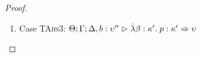 \begin{proof}
\begin{enumerate}
  First, the syntax:
  \begin{tabbedproof}
    \oo By inversion, $\judgeA[\Theta; \Gamma, x:A; \Delta, b:\upsilon'']{p}{\upsilon}$ \\
    \oo By induction, $\judgeA[\Theta; \Gamma, x:A; \Delta]{[r/b]p}{\upsilon}$ \\
    \oo By rule, $\judgeA[\Theta; \Gamma; \Delta]{\pfun{x}{A}{[r/b]p}}{A \To \upsilon}$ \\
    \oo By def of subst, $\judgeA[\Theta; \Gamma; \Delta]{[r/b](\pfun{x}{A}{p})}{(A \To \upsilon)}$ \\
  \end{tabbedproof}
  For semantics, consider $\interp{\judgeA[\Theta; \Gamma; \Delta]{[r/b](\pfun{x}{A}{p})}{(A \To \upsilon)}}\;\theta\;\gamma\;\delta$ \\
  \begin{eqnproof}
          {Semantics}
          {Induction}
          {Semantics}
  \end{eqnproof}
  We silently permute arguments in the second line. 

\item Case \textsc{TAbs3}: $\judgeA[\Theta; \Gamma; \Delta, b:\upsilon'']{\pfun{\beta}{\kappa'}{p}}{\kappa' \To \upsilon}$
  

\end{enumerate}
\end{proof}
